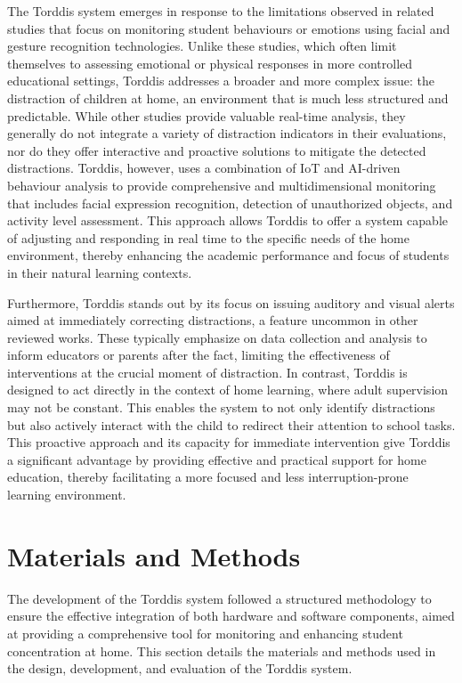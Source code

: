 \documentclass[a4paper,fleqn]{cas-sc}
\begin{document}
			The Torddis system emerges in response to the limitations observed in related studies that focus on monitoring student behaviours or emotions using facial and gesture recognition technologies. Unlike these studies, which often limit themselves to assessing emotional or physical responses in more controlled educational settings, Torddis addresses a broader and more complex issue: the distraction of children at home, an environment that is much less structured and predictable. While other studies provide valuable real-time analysis, they generally do not integrate a variety of distraction indicators in their evaluations, nor do they offer interactive and proactive solutions to mitigate the detected distractions. Torddis, however, uses a combination of IoT and AI-driven behaviour analysis to provide comprehensive and multidimensional monitoring that includes facial expression recognition, detection of unauthorized objects, and activity level assessment. This approach allows Torddis to offer a system capable of adjusting and responding in real time to the specific needs of the home environment, thereby enhancing the academic performance and focus of students in their natural learning contexts.
			
			Furthermore, Torddis stands out by its focus on issuing auditory and visual alerts aimed at immediately correcting distractions, a feature uncommon in other reviewed works. These typically emphasize on data collection and analysis to inform educators or parents after the fact, limiting the effectiveness of interventions at the crucial moment of distraction. In contrast, Torddis is designed to act directly in the context of home learning, where adult supervision may not be constant. This enables the system to not only identify distractions but also actively interact with the child to redirect their attention to school tasks. This proactive approach and its capacity for immediate intervention give Torddis a significant advantage by providing effective and practical support for home education, thereby facilitating a more focused and less interruption-prone learning environment.
			
	\section{Materials and Methods}
	\label{seccion:Tres}
	The development of the Torddis system followed a structured methodology to ensure the effective integration of both hardware and software components, aimed at providing a comprehensive tool for monitoring and enhancing student concentration at home. This section details the materials and methods used in the design, development, and evaluation of the Torddis system.
	
\end{document}
